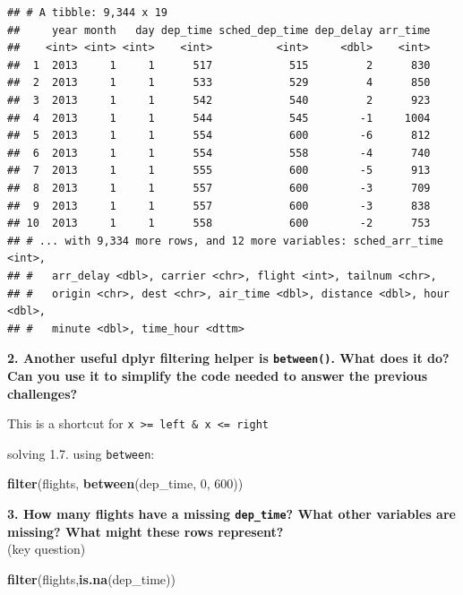 \documentclass[]{book}
\newenvironment{Shaded}{\begin{snugshade}}{\end{snugshade}}
\newcommand{\DecValTok}[1]{\textcolor[rgb]{0.00,0.00,0.81}{#1}}
\newcommand{\KeywordTok}[1]{\textcolor[rgb]{0.13,0.29,0.53}{\textbf{#1}}}
\newcommand{\NormalTok}[1]{#1}
\theoremstyle{definition}
\theoremstyle{definition}
\theoremstyle{definition}
\theoremstyle{remark}
\begin{document}
\begin{verbatim}
## # A tibble: 9,344 x 19
##     year month   day dep_time sched_dep_time dep_delay arr_time
##    <int> <int> <int>    <int>          <int>     <dbl>    <int>
##  1  2013     1     1      517            515         2      830
##  2  2013     1     1      533            529         4      850
##  3  2013     1     1      542            540         2      923
##  4  2013     1     1      544            545        -1     1004
##  5  2013     1     1      554            600        -6      812
##  6  2013     1     1      554            558        -4      740
##  7  2013     1     1      555            600        -5      913
##  8  2013     1     1      557            600        -3      709
##  9  2013     1     1      557            600        -3      838
## 10  2013     1     1      558            600        -2      753
## # ... with 9,334 more rows, and 12 more variables: sched_arr_time <int>,
## #   arr_delay <dbl>, carrier <chr>, flight <int>, tailnum <chr>,
## #   origin <chr>, dest <chr>, air_time <dbl>, distance <dbl>, hour <dbl>,
## #   minute <dbl>, time_hour <dttm>
\end{verbatim}

\textbf{2. Another useful dplyr filtering helper is \texttt{between()}.
What does it do? Can you use it to simplify the code needed to answer
the previous challenges?}

This is a shortcut for
\texttt{x\ \textgreater{}=\ left\ \&\ x\ \textless{}=\ right}

solving 1.7. using \texttt{between}:

\begin{Shaded}
\begin{Highlighting}[]
\KeywordTok{filter}\NormalTok{(flights, }\KeywordTok{between}\NormalTok{(dep_time, }\DecValTok{0}\NormalTok{, }\DecValTok{600}\NormalTok{))}
\end{Highlighting}
\end{Shaded}

\textbf{3. How many flights have a missing \texttt{dep\_time}? What
other variables are missing? What might these rows represent?}\\
(key question)

\begin{Shaded}
\begin{Highlighting}[]
\KeywordTok{filter}\NormalTok{(flights,}\KeywordTok{is.na}\NormalTok{(dep_time))}
\end{Highlighting}
\end{Shaded}
\end{document}
